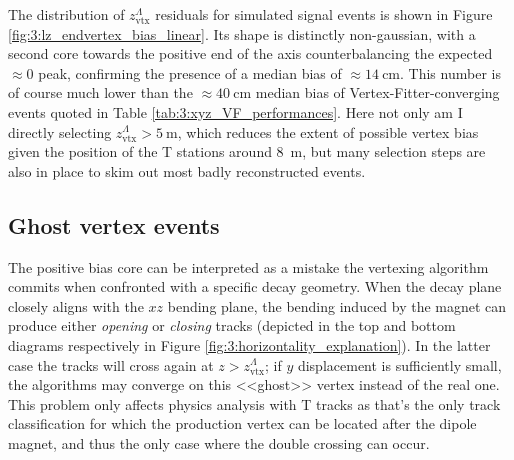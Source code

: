 The distribution of $z_\text{vtx}^\Lambda$ residuals for simulated signal events is shown in Figure \ref{fig:3:lz_endvertex_bias_linear}.
Its shape is distinctly non-gaussian, with a second core towards the positive end of the axis counterbalancing the expected $\approx 0$ peak, confirming the presence of a median bias of $\approx \SI{14}{\centi\meter}$. This number is of course much lower than the $\approx \SI{40}{\centi\meter}$ median bias of Vertex-Fitter-converging events quoted in Table \ref{tab:3:xyz_VF_performances}. Here not only am I directly selecting $z_\text{vtx}^\Lambda > \SI{5}{\meter}$, which reduces the extent of possible vertex bias given the position of the T stations around \SI{8}{\meter}, but many selection steps are also in place to skim out most badly reconstructed events.

\subsection{Ghost vertex events}
\label{sec:3:ghost_vertex}

The positive bias core can be interpreted as a mistake the vertexing algorithm commits when confronted with a specific decay geometry.
When the \lambdadecay decay plane closely aligns with the $xz$ bending plane, the bending induced by the magnet can produce either \textit{opening} or \textit{closing} tracks (depicted in the top and bottom diagrams respectively in Figure \ref{fig:3:horizontality_explanation}).
In the latter case the tracks will cross again at $z>z_\text{vtx}^\Lambda$;
if $y$ displacement is sufficiently small, the algorithms may converge on this <<ghost>> vertex instead of the real one.
This problem only affects physics analysis with T tracks as that's the only track classification for which the production vertex can be located after the dipole magnet, and thus the only case where the double crossing can occur.



